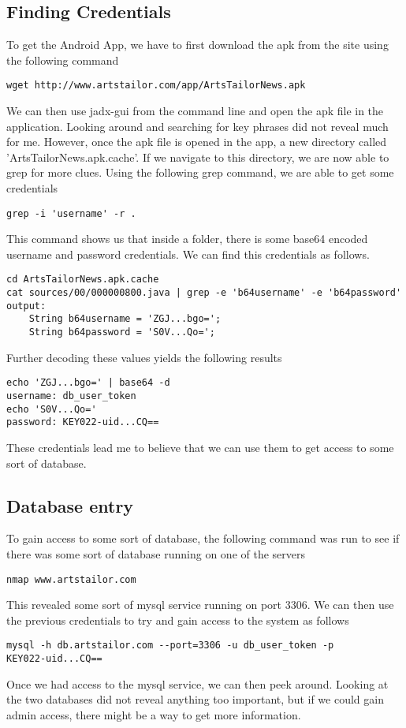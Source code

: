 \documentclass[notitlepage]{article}
\begin{document}
    \subsection{Finding Credentials}
    To get the Android App, we have to first download the apk from the site using the following command
\begin{verbatim}
wget http://www.artstailor.com/app/ArtsTailorNews.apk
\end{verbatim}
    We can then use jadx-gui from the command line and open the apk file in the application. Looking around and searching for key phrases did not reveal much for me. However, once the apk
    file is opened in the app, a new directory called 'ArtsTailorNews.apk.cache'. If we navigate to this directory, we are now 
    able to grep for more clues. Using the following grep command, we are able to get some credentials
\begin{verbatim}
grep -i 'username' -r .
\end{verbatim}
    This command shows us that inside a folder, there is some base64 encoded username and password credentials. We can find this credentials
    as follows.
\begin{verbatim}
cd ArtsTailorNews.apk.cache
cat sources/00/000000800.java | grep -e 'b64username' -e 'b64password'
output:
    String b64username = 'ZGJ...bgo=';
    String b64password = 'S0V...Qo=';
\end{verbatim}
    Further decoding these values yields the following results
\begin{verbatim}
echo 'ZGJ...bgo=' | base64 -d
username: db_user_token
echo 'S0V...Qo='
password: KEY022-uid...CQ==
\end{verbatim}
    These credentials lead me to believe that we can use them to get access to some sort of database.
    \subsection{Database entry}
    To gain access to some sort of database, the following command was run to see if there was some sort of database running on one 
    of the servers
\begin{verbatim}
nmap www.artstailor.com
\end{verbatim}
    This revealed some sort of mysql service running on port 3306. We can then use the previous credentials
    to try and gain access to the system as follows
\begin{verbatim}
mysql -h db.artstailor.com --port=3306 -u db_user_token -p
KEY022-uid...CQ==
\end{verbatim}
    Once we had access to the mysql service, we can then peek around. Looking at the two databases did not reveal
    anything too important, but if we could gain admin access, there might be a way to get more information.
\end{document}
